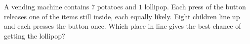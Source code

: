 A vending machine contains $7$ potatoes and $1$ lollipop. Each press of the button releases one of the items still inside, each equally likely. Eight children line up and each presses the button once. Which place in line gives the best chance of getting the lollipop?
